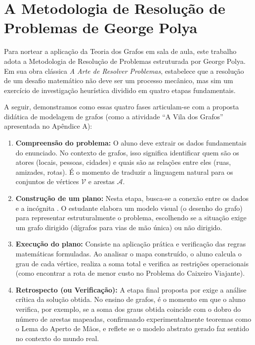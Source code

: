 \documentclass[
  12pt,
  oneside,
  a4paper,
  english,
  brazilian
  ]{abntex2}
\theoremstyle{definition}
\begin{document}
\section{A Metodologia de Resolução de Problemas de George Polya}
\label{sec:polya}

Para nortear a aplicação da Teoria dos Grafos em sala de aula, este trabalho adota a Metodologia de Resolução de Problemas estruturada por George Polya. Em sua obra clássica \textit{A Arte de Resolver Problemas}, \textcite{polya2006} estabelece que a resolução de um desafio matemático não deve ser um processo mecânico, mas sim um exercício de investigação heurística dividido em quatro etapas fundamentais. 

A seguir, demonstramos como essas quatro fases articulam-se com a proposta didática de modelagem de grafos (como a atividade ``A Vila dos Grafos'' apresentada no Apêndice A):

\begin{enumerate}
    \item \textbf{Compreensão do problema:} O aluno deve extrair os dados fundamentais do enunciado. No contexto de grafos, isso significa identificar quem são os atores (locais, pessoas, cidades) e quais são as relações entre eles (ruas, amizades, rotas). É o momento de traduzir a linguagem natural para os conjuntos de vértices $\mathcal{V}$ e arestas $\mathcal{A}$.
    
    \item \textbf{Construção de um plano:} Nesta etapa, busca-se a conexão entre os dados e a incógnita \cite{polya2006}. O estudante elabora um modelo visual (o desenho do grafo) para representar estruturalmente o problema, escolhendo se a situação exige um grafo dirigido (dígrafos para vias de mão única) ou não dirigido.
    
    \item \textbf{Execução do plano:} Consiste na aplicação prática e verificação das regras matemáticas formuladas. Ao analisar o mapa construído, o aluno calcula o grau de cada vértice, realiza a soma total e verifica as restrições operacionais (como encontrar a rota de menor custo no Problema do Caixeiro Viajante).
    
    \item \textbf{Retrospecto (ou Verificação):} A etapa final proposta por \textcite{polya2006} exige a análise crítica da solução obtida. No ensino de grafos, é o momento em que o aluno verifica, por exemplo, se a soma dos graus obtida coincide com o dobro do número de arestas mapeadas, confirmando experimentalmente teoremas como o Lema do Aperto de Mãos, e reflete se o modelo abstrato gerado faz sentido no contexto do mundo real.
\end{enumerate}
\end{document}
